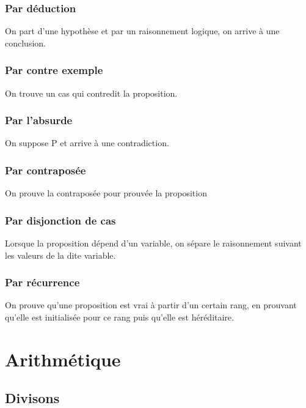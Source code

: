 \documentclass{article}
\begin{document}
\subsubsection{Par déduction}
    On part d'une hypothèse et par un raisonnement logique, on arrive à une conclusion.

\subsubsection{Par contre exemple}
    On trouve un cas qui contredit la proposition.

\subsubsection{Par l'absurde}
    On suppose P et arrive à une contradiction.

\subsubsection{Par contraposée}
    On prouve la contraposée pour prouvée la proposition

\subsubsection{Par disjonction de cas}
    Lorsque la proposition dépend d'un variable, on sépare le raisonnement suivant les valeurs de la dite variable.

\subsubsection{Par récurrence}
    On prouve qu'une proposition est vrai à partir d'un certain rang, en prouvant qu'elle est initialisée pour ce rang puis qu'elle est héréditaire.



\section{Arithmétique}


\subsection{Divisons}
\end{document}
